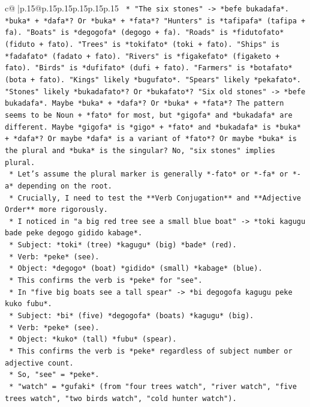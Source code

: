 \documentclass{article}
\begin{document}
{\begin{supertabular}{c@{$\;$}|p{.15\linewidth}@{}p{.15\linewidth}p{.15\linewidth}p{.15\linewidth}p{.15\linewidth}p{.15\linewidth}}
{{{\texttt{        *   "The six stones" {-}> *befe bukadafa*. *buka* + *dafa*? Or *buka* + *fata*? "Hunters" is *tafipafa* (tafipa + fa). "Boats" is *degogofa* (degogo + fa). "Roads" is *fidutofato* (fiduto + fato). "Trees" is *tokifato* (toki + fato). "Ships" is *fadafato* (fadato + fato). "Rivers" is *figakefato* (figaketo + fato). "Birds" is *dufifato* (dufi + fato). "Farmers" is *botafato* (bota + fato). "Kings" likely *bugufato*. "Spears" likely *pekafato*. "Stones" likely *bukadafato*? Or *bukafato*? "Six old stones" {-}> *befe bukadafa*. Maybe *buka* + *dafa*? Or *buka* + *fata*? The pattern seems to be Noun + *fato* for most, but *gigofa* and *bukadafa* are different. Maybe *gigofa* is *gigo* + *fato* and *bukadafa* is *buka* + *dafa*? Or maybe *dafa* is a variant of *fato*? Or maybe *buka* is the plural and *buka* is the singular? No, "six stones" implies plural.} \\
\texttt{        *   Let's assume the plural marker is generally *{-}fato* or *{-}fa* or *{-}a* depending on the root.} \\
\texttt{        *   Crucially, I need to test the **Verb Conjugation** and **Adjective Order** more rigorously.} \\
\texttt{        *   I noticed in "a big red tree see a small blue boat" {-}> *toki kagugu bade peke degogo gidido kabage*.} \\
\texttt{            *   Subject: *toki* (tree) *kagugu* (big) *bade* (red).} \\
\texttt{            *   Verb: *peke* (see).} \\
\texttt{            *   Object: *degogo* (boat) *gidido* (small) *kabage* (blue).} \\
\texttt{            *   This confirms the verb is *peke* for "see".} \\
\texttt{        *   In "five big boats see a tall spear" {-}> *bi degogofa kagugu peke kuko fubu*.} \\
\texttt{            *   Subject: *bi* (five) *degogofa* (boats) *kagugu* (big).} \\
\texttt{            *   Verb: *peke* (see).} \\
\texttt{            *   Object: *kuko* (tall) *fubu* (spear).} \\
\texttt{            *   This confirms the verb is *peke* regardless of subject number or adjective count.} \\
\texttt{        *   So, "see" = *peke*.} \\
\texttt{        *   "watch" = *gufaki* (from "four trees watch", "river watch", "five trees watch", "two birds watch", "cold hunter watch").} \\
}}}
\end{supertabular}}
\end{document}
